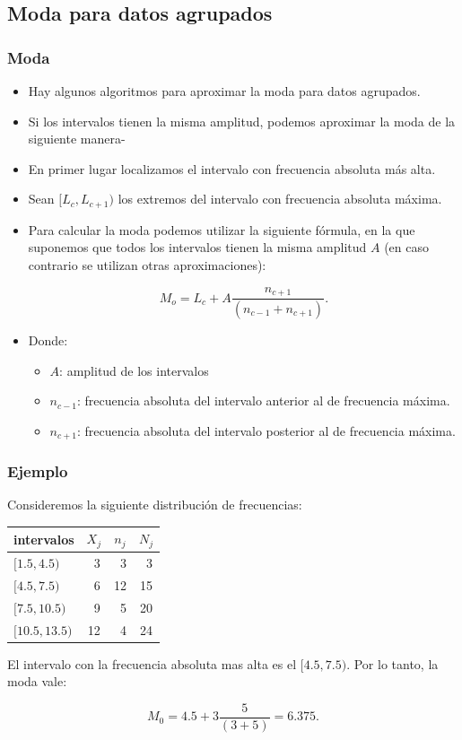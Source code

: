 \subsection{Moda para datos agrupados}

\begin{frame}
\frametitle{Moda}
\begin{itemize}
\item Hay algunos algoritmos para aproximar la moda  para datos agrupados.
\item Si los intervalos tienen la misma amplitud, podemos aproximar la moda de la siguiente manera-
\item En primer lugar localizamos el intervalo con frecuencia absoluta más alta.
\item Sean $[L_c, L_{c+1})$ los extremos del intervalo con  frecuencia absoluta máxima.
\end{itemize}
\end{frame}

\begin{frame}
\begin{itemize}
\item Para calcular la moda podemos utilizar  la siguiente  fórmula, en la que suponemos que
todos los intervalos tienen la misma amplitud $A$ (en caso contrario se utilizan otras
aproximaciones):

$$M_o =L_c + A \frac{n_{c+1}}{(n_{c-1}+n_{c+1})}.$$

\item Donde:
\begin{itemize}
\item $A$: amplitud de los intervalos
\item $n_{c-1}$: frecuencia absoluta del intervalo anterior al de
frecuencia máxima.
\item $n_{c+1}$: frecuencia absoluta del intervalo posterior al de
frecuencia máxima.
\end{itemize}
\end{itemize}
\end{frame}

\begin{frame}
\frametitle{Ejemplo}
Consideremos la siguiente distribución de frecuencias: 
\begin{center}
\begin{tabular}{lccc}
intervalos    & $X_j$ & $n_j$ & $N_j$ \\ \hline $[1.5,4.5) $  &  \ 3 & \ 3 &   \ 3  \\
$[4.5,7.5) $  &  \ 6 &  12 &  15  \\ $[7.5,10.5)$  &  \ 9 &   \ 5 &  20
\\ $[10.5,13.5)$ & 12 &   \ 4 &  24  \\ \hline
\end{tabular}
\end{center}
\end{frame}
\begin{frame}
El intervalo con la frecuencia absoluta mas alta es el $[4.5,7.5)$. Por lo tanto, la moda
vale:

$$M_0=4.5+3\frac{5}{(3+5)}=6.375.$$
\end{frame}


